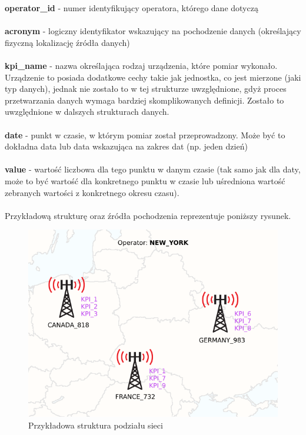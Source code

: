 \documentclass[eng,printmode]{mgr}
\begin{document}
\noindent \textbf{operator\_id} - numer identyfikujący operatora, którego dane dotyczą
\\\\
\textbf{acronym} - logiczny identyfikator wskazujący na pochodzenie danych (określający fizyczną lokalizację źródła danych)
\\\\
\textbf{kpi\_name} - nazwa określająca rodzaj urządzenia, które pomiar wykonało. Urządzenie to posiada dodatkowe cechy takie jak jednostka, co jest mierzone (jaki typ danych), jednak nie zostało to w tej strukturze uwzględnione, gdyż proces przetwarzania danych wymaga bardziej skomplikowanych definicji. Zostało to uwzględnione w dalszych strukturach danych.
\\\\
\textbf{date} - punkt w czasie, w którym pomiar został przeprowadzony. Może być to dokładna data lub data wskazująca na zakres dat (np. jeden dzień)
\\\\
\textbf{value} - wartość liczbowa dla tego punktu w danym czasie (tak samo jak dla daty, może to być wartość dla konkretnego punktu w czasie lub uśredniona wartość zebranych wartości z konkretnego okresu czasu).
\\ \\
Przykładową strukturę oraz źródła pochodzenia reprezentuje poniższy rysunek.
\begin{figure}[H]
\includegraphics[scale=0.6]{struct}
\caption{Przykładowa struktura podziału sieci}
\end{figure}
\end{document}
